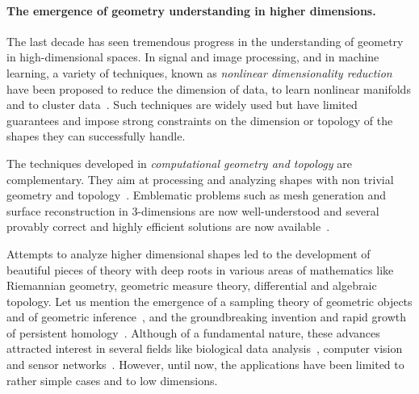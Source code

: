 \paragraph{The emergence of geometry understanding in higher dimensions.}
The last decade has seen tremendous progress in  the understanding of geometry in high-dimensional spaces. %
In signal and image processing, and in machine learning, a variety of techniques, known as {\em nonlinear dimensionality reduction} have been proposed to reduce the dimension of data, to learn nonlinear manifolds and to cluster data~\cite{lv-nldr-2007}. %
Such techniques are widely used but have limited guarantees and 
impose strong constraints on the dimension or topology of the shapes they can successfully handle. 

The techniques developed in {\em computational geometry and topology}  are complementary. They aim at processing and analyzing shapes with non trivial geometry and topology~\cite{hh-ct-2010}. 
Emblematic problems such as mesh generation and surface reconstruction in 3-dimensions are now well-understood and several provably correct and highly efficient solutions are now available~\cite{geometrica-ecg-book}. 

Attempts to analyze higher dimensional shapes led to the development of beautiful pieces of theory with deep roots in various areas of mathematics like Riemannian geometry, geometric measure theory, differential and algebraic topology. Let us mention  the emergence of a sampling theory of geometric objects and of geometric inference~\cite{geometrica-ccl09}, and the groundbreaking invention and rapid growth of persistent homology~\cite{eh-ph-2008}.
Although of a fundamental nature, these advances 
attracted  interest in several fields like biological data analysis~\cite{fpgo-airc-2009}, computer vision~\cite{cids-lbsni-2008} and sensor networks~\cite{rg-bptd-2008}. However, 
until now, the applications have been limited  to rather simple cases and to low dimensions.


